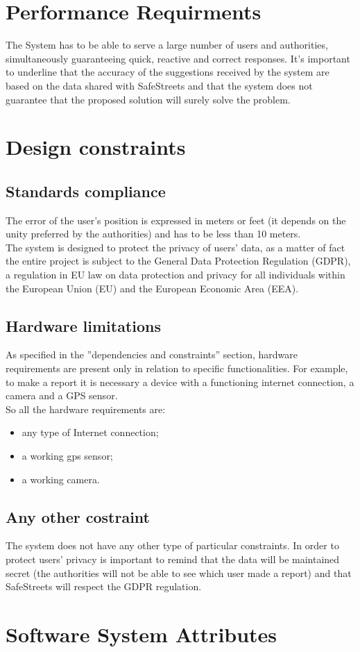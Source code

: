\documentclass[12pt,a4paper]{report}
\begin{document}
			
	
	\section{Performance Requirments}
		The System has to be able to serve a large number of users and authorities, simultaneously guaranteeing quick, 
		reactive and correct responses. It's important to underline that the accuracy of the suggestions received by the system
		are based on the data shared with SafeStreets and that the system does not guarantee that the proposed solution will surely
		solve the problem.
	\section{Design constraints}
		\subsection{Standards compliance}
			The error of the user's position is expressed in meters or feet (it depends on the unity preferred by the authorities) and has to be less than 10 meters.\\
			The system is designed to protect the privacy of users' data, as a matter of fact the entire 
			project is subject to the General Data Protection Regulation (GDPR), a regulation in EU 
			law on data protection and privacy for all individuals within the European Union (EU) and 
			the European Economic Area (EEA).
		\subsection{Hardware limitations}
			As specified in the ”dependencies and constraints” section, hardware requirements are present 
			only in relation to specific functionalities. For example, to make a report it is necessary a device with
			a functioning internet connection, a camera and a GPS sensor.\\
			So all the hardware requirements are:
			\begin{itemize}
				\item any type of Internet connection;
				\item a working gps sensor;
				\item a working camera.
			\end{itemize}
		\subsection{Any other costraint}
			The system does not have any other type of particular constraints. In order to protect users' privacy is important
			to remind that the data will be maintained secret (the authorities will not be able to see which user made a report)
			and that SafeStreets will respect the GDPR regulation.	\section{Software System Attributes}
\end{document}
